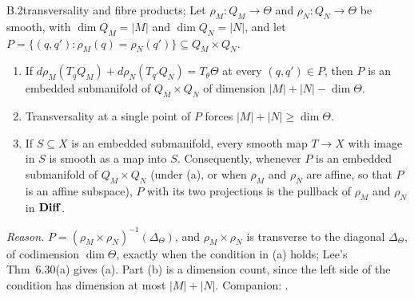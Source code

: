 \begin{auxresult}{B.2}{transversality and fibre products}{\citep[Cor.~5.30 and Thm~6.30]{xlee2013introduction};
\citep[\S1.5]{xguillemin1974differential}}
Let $\rho_M:Q_M\to\Theta$ and $\rho_N:Q_N\to\Theta$ be smooth, with $\dim Q_M=\lvert M\rvert$ and
$\dim Q_N=\lvert N\rvert$, and let $P=\{(q,q'):\rho_M(q)=\rho_N(q')\}\subseteq Q_M\times Q_N$.
\begin{enumerate}[label=(\alph*)]
  \item If $d\rho_M(T_qQ_M)+d\rho_N(T_{q'}Q_N)=T_\theta\Theta$ at every $(q,q')\in P$, then $P$ is an embedded
    submanifold of $Q_M\times Q_N$ of dimension $\lvert M\rvert+\lvert N\rvert-\dim\Theta$.
  \item Transversality at a single point of $P$ forces $\lvert M\rvert+\lvert N\rvert\ge\dim\Theta$.
  \item If $S\subseteq X$ is an embedded submanifold, every smooth map $T\to X$ with image in $S$ is smooth as a map
    into $S$. Consequently, whenever $P$ is an embedded submanifold of $Q_M\times Q_N$ (under (a), or when $\rho_M$ and
    $\rho_N$ are affine, so that $P$ is an affine subspace), $P$ with its two projections is the pullback of $\rho_M$ and
    $\rho_N$ in $\mathbf{Diff}$.
\end{enumerate}
\end{auxresult}
\noindent\emph{Reason.} $P=(\rho_M\times\rho_N)^{-1}(\Delta_\Theta)$, and $\rho_M\times\rho_N$ is transverse to the
diagonal $\Delta_\Theta$, of codimension $\dim\Theta$, exactly when the condition in (a) holds; Lee's Thm~6.30(a) gives
(a). Part (b) is a dimension count, since the left side of the condition has dimension at most
$\lvert M\rvert+\lvert N\rvert$. Companion: .


